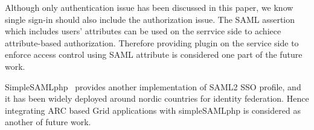 \documentclass[conference]{IEEEtran}
\begin{document}
Although only authentication issue has been discussed in this paper, we know single
sign-in should also include the authorization issue. The SAML assertion which includes
users' attributes can be used on the serrvice side to achiece attribute-based authorization.
Therefore providing plugin on the service side to enforce access control using SAML attribute
is considered one part of the future work.

SimpleSAMLphp~\cite{simplesamllink} provides another implementation of SAML2 SSO profile, and it 
has been widely deployed around nordic countries for identity federation. Hence integrating
ARC based Grid applications with simpleSAMLphp is considered as another of future work.



%
%



%
%
\end{document}
